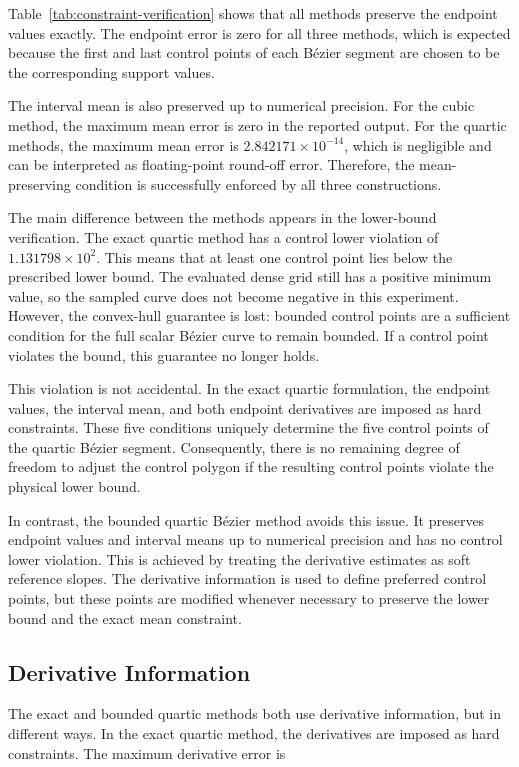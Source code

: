 \documentclass[12pt,a4paper]{article}
\begin{document}
Table~\ref{tab:constraint-verification} shows that all methods preserve the
endpoint values exactly. The endpoint error is zero for all three methods,
which is expected because the first and last control points of each B\'ezier
segment are chosen to be the corresponding support values.

The interval mean is also preserved up to numerical precision. For the cubic
method, the maximum mean error is zero in the reported output. For the
quartic methods, the maximum mean error is \(2.842171\times 10^{-14}\), which
is negligible and can be interpreted as floating-point round-off error.
Therefore, the mean-preserving condition is successfully enforced by all
three constructions.

The main difference between the methods appears in the lower-bound
verification. The exact quartic method has a control lower violation of
\(1.131798\times 10^2\). This means that at least one control point lies below
the prescribed lower bound. The evaluated dense grid still has a positive
minimum value, so the sampled curve does not become negative in this
experiment. However, the convex-hull guarantee is lost: bounded control
points are a sufficient condition for the full scalar B\'ezier curve to remain
bounded. If a control point violates the bound, this guarantee no longer
holds.

This violation is not accidental. In the exact quartic formulation, the
endpoint values, the interval mean, and both endpoint derivatives are imposed
as hard constraints. These five conditions uniquely determine the five
control points of the quartic B\'ezier segment. Consequently, there is no
remaining degree of freedom to adjust the control polygon if the resulting
control points violate the physical lower bound.

In contrast, the bounded quartic B\'ezier method avoids this issue. It
preserves endpoint values and interval means up to numerical precision and
has no control lower violation. This is achieved by treating the derivative
estimates as soft reference slopes. The derivative information is used to
define preferred control points, but these points are modified whenever
necessary to preserve the lower bound and the exact mean constraint.

\subsection{Derivative Information}

The exact and bounded quartic methods both use derivative information, but in
different ways. In the exact quartic method, the derivatives are imposed as
hard constraints. The maximum derivative error is
\end{document}
